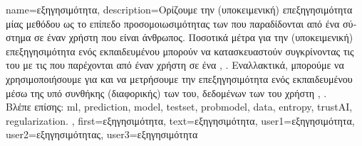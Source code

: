 {name={\foreignlanguage{greek}{εξηγησιμότητα}},
	description={\foreignlanguage{greek}{Ορίζουμε την (υποκειμενική) επεξηγησιμότητα μίας μεθόδου} 
		 \foreignlanguage{greek}{ως το επίπεδο προσομοιωσιμότητας} \cite{Colin:2022aa} \foreignlanguage{greek}{των} 
		 \foreignlanguage{greek}{που παραδίδονται από ένα σύστημα}  \foreignlanguage{greek}{σε 
		έναν χρήστη που είναι άνθρωπος. Ποσοτικά μέτρα για την (υποκειμενική) επεξηγησιμότητα ενός εκπαιδευμένου} 
		 \foreignlanguage{greek}{μπορούν να κατασκευαστούν συγκρίνοντας τις}  
		 \foreignlanguage{greek}{του με τις}  \foreignlanguage{greek}{που 
		παρέχονται από έναν χρήστη σε ένα}  \cite{Colin:2022aa}, \cite{Zhang:2024aa}. 
		\foreignlanguage{greek}{Εναλλακτικά, μπορούμε να χρησιμοποιήσουμε}  
		\foreignlanguage{greek}{για}  \foreignlanguage{greek}{και να μετρήσουμε την επεξηγησιμότητα ενός εκπαιδευμένου}  
		  \foreignlanguage{greek}{μέσω της υπό συνθήκης (διαφορικής)}  
		\foreignlanguage{greek}{των}  \foreignlanguage{greek}{του}, \foreignlanguage{greek}{δεδομένων των} 
		 \foreignlanguage{greek}{του χρήστη} \cite{JunXML2020}, \cite{Chen2018}. \\
		\foreignlanguage{greek}{Βλέπε επίσης:} \gls{ml}, \gls{prediction}, \gls{model}, \gls{testset}, \gls{probmodel}, \gls{data}, \gls{entropy}, \gls{trustAI}, \gls{regularization}. },
	first={\foreignlanguage{greek}{εξηγησιμότητα}},
	text={\foreignlanguage{greek}{εξηγησιμότητα}},
	user1={\foreignlanguage{greek}{εξηγησιμότητα}}, %
	user2={\foreignlanguage{greek}{εξηγησιμότητας}}, %
	user3={\foreignlanguage{greek}{εξηγησιμότητα}} %
}

